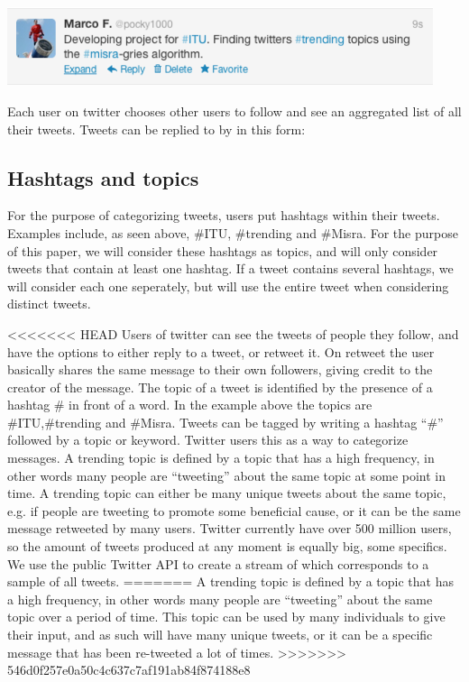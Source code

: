 \documentclass[12pt]{article}
\begin{document}
\newline
\includegraphics[width=125mm]{tweet.png}
\newline

Each user on twitter chooses other users to follow and see an aggregated list of all their tweets. Tweets can be replied to by in this form: 

\subsection{Hashtags and topics}
For the purpose of categorizing tweets, users put hashtags within their tweets. Examples include, as seen above, \#ITU, \#trending and \#Misra. For the purpose of this paper, we will consider these hashtags as topics, and will only consider tweets that contain at least one hashtag. If a tweet contains several hashtags, we will consider each one seperately, but will use the entire tweet when considering distinct tweets.

<<<<<<< HEAD
Users of twitter can see the tweets of people they follow, and have the options to either reply to a tweet, or retweet it. On retweet the user basically shares the same message to their own followers, giving credit to the creator of the message.
The topic of a tweet is identified by the presence of a hashtag \# in front of a word. In the example above the topics are \#ITU,\#trending and \#Misra.
Tweets can be tagged by writing a hashtag ``\#'' followed by a topic or keyword. Twitter users this as a way to categorize messages.
A trending topic is defined by a topic that has a high frequency, in other words many people are ``tweeting'' about the same topic at some point in time. A trending topic can either be many unique tweets about the same topic, e.g. if people are tweeting to promote some beneficial cause, or it can be the same message retweeted by many users.
Twitter currently have over 500 million users, so the amount of tweets produced at any moment is equally big, some specifics. We use the public Twitter API to create a stream of which corresponds to a sample of all tweets. 
=======
A trending topic is defined by a topic that has a high frequency, in other words many people are ``tweeting'' about the same topic over a period of time. This topic can be used by many individuals to give their input, and as such will have many unique tweets, or it can be a specific message that has been re-tweeted a lot of times.
>>>>>>> 546d0f257e0a50c4c637c7af191ab84f874188e8
\end{document}
